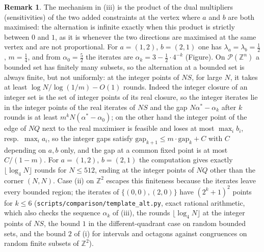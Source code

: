 \documentclass[11pt]{amsart}
\theoremstyle{definition}
\newtheorem{rem}[thm]{Remark}
\newcommand{\cP}{\mathcal P}
\begin{document}
\begin{rem}\label{rem:dual}
The mechanism in (iii) is the product of the dual multipliers
(sensitivities) of the two added constraints at the vertex where $a$
and $b$ are both maximised: the alternation is infinite exactly when
this product is strictly between $0$ and $1$, as it is whenever the two
directions are maximised at the same vertex and are not proportional.
For $a=(1,2)$, $b=(2,1)$ one has $\lambda_a=\lambda_b=\frac12$, $m=
\frac14$, and from $\alpha_0=\frac52$ the iterates are $\alpha_k=3-
\frac12\cdot4^{-k}$ (Figure). On $\cP(\mathbb Z^n)$ a bounded set has
finitely many subsets, so the alternation at a bounded set is always
finite, but not uniformly: at the integer points of $NS$, for large
$N$, it takes at least $\log N/\log(1/m)-O(1)$ rounds. Indeed the
integer closure of an integer set is the set of integer points of its
real closure, so the integer iterates lie in the integer points of the
real iterates of $NS$ and the gap $N\alpha^*-\alpha_k$ after $k$
rounds is at least $m^kN(\alpha^*-\alpha_0)$; on the other hand the
integer point of the edge of $NQ$ next to the real maximiser is
feasible and loses at most $\max_ib_i$, resp.\ $\max_ia_i$, so the
integer gaps satisfy $\mathrm{gap}_{k+1}\le m\cdot\mathrm{gap}_k+C$
with $C$ depending on $a,b$ only, and the gap at a common fixed point
is at most $C/(1-m)$. For $a=(1,2)$, $b=(2,1)$ the computation gives
exactly $\lfloor\log_4N\rfloor$ rounds for $N\le512$, ending at the
integer points of $NQ$ other than the corner $(N,N)$. Case (ii) on $\mathbb Z^2$ escapes
this finiteness because the iterates leave every bounded region; the
iterates of $\{(0,0),(2,0)\}$ have $(2^k+1)^2$ points for $k\le6$
(\texttt{scripts/comparison/template\_alt.py}, exact rational
arithmetic, which also checks the sequence $\alpha_k$ of (iii), the
rounds $\lfloor\log_4N\rfloor$ at the integer points of $NS$, the
bound $1$ in the different-quadrant case on random bounded sets, and
the bound $2$ of (i) for intervals and octagons against congruences on
random finite subsets of $\mathbb Z^2$).
\end{rem}
\end{document}
